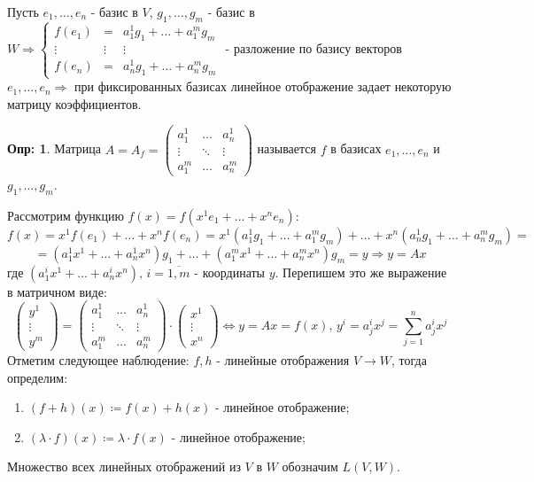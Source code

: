 \documentclass[12pt]{article}
\theoremstyle{definition}
\newtheorem{defn}{Опр:}
\begin{document}
Пусть $e_1, \dotsc, e_n$ - базис в $V$, $g_1, \dotsc, g_m$ - базис в $W \Rightarrow \left\{\begin{array}{ccc}
	f(e_1) & = & a_1^1 g_1 + \dotsc + a_1^m g_m \\
	\vdots & \vdots & \vdots \\
	f(e_n) & = & a_n^1 g_1 + \dotsc + a_n^m g_m
\end{array}\right.$ - разложение по базису векторов $e_1, \dotsc, e_n \Rightarrow$ при фиксированных базисах линейное отображение задает некоторую матрицу коэффициентов.

\begin{defn}
	Матрица $A = A_f = 
	\begin{pmatrix}
		a_1^1 & \dotsc & a_n^1 \\
		\vdots & \ddots & \vdots \\
		a_1^m & \dotsc & a_n^m 
	\end{pmatrix}$ называется  $f$ в базисах $e_1, \dotsc, e_n$ и $g_1, \dotsc, g_m$.
\end{defn}
Рассмотрим функцию $f(x) = f(x^1 e_1 + \dotsc + x^n e_n)$:
$$
	 f(x) = x^1f(e_1) + \dotsc + x^n f(e_n) = x^1(a_1^1 g_1 + \dotsc + a_1^m g_m) + \dotsc + x^n(a_n^1 g_1 + \dotsc + a_n^m g_m) = 
$$
$$
	= (a_1^1 x^1 + \dotsc + a_n^1 x^n) g_1 + \dotsc + (a_1^m x^1 + \dotsc + a_n^m x^n)g_m = y \Rightarrow y = Ax
$$
где $(a_1^i x^1 + \dotsc + a_n^i x^n), \, i = \overline{1,m}$ - координаты $y$. Перепишем это же выражение в матричном виде:
$$
	\begin{pmatrix}
		y^1 \\
		\vdots \\
		y^m
	\end{pmatrix} = 
	\begin{pmatrix}
		a_1^1 & \dotsc & a_n^1 \\
		\vdots & \ddots & \vdots \\
		a_1^m & \dotsc & a_n^m 
	\end{pmatrix}{\cdot}
	\begin{pmatrix}
		x^1 \\
		\vdots \\ 
		x^n
	\end{pmatrix} \Leftrightarrow y = Ax = f(x), \, y^i = a_j^ix^j = \displaystyle \sum\limits_{j = 1}^{n} a_j^i x^j
$$
Отметим следующее наблюдение: $f,h$ - линейные отображения $V \to W$, тогда определим:
\begin{enumerate}[label ={(\arabic*)}]
	\item $(f + h)(x) \coloneqq f(x) + h(x)$ - линейное отображение;
	\item $(\lambda{\cdot}f)(x) \coloneqq \lambda{\cdot}f(x)$ - линейное отображение;
\end{enumerate}
Множество всех линейных отображений из $V$ в $W$ обозначим $L(V,W)$.
\end{document}
